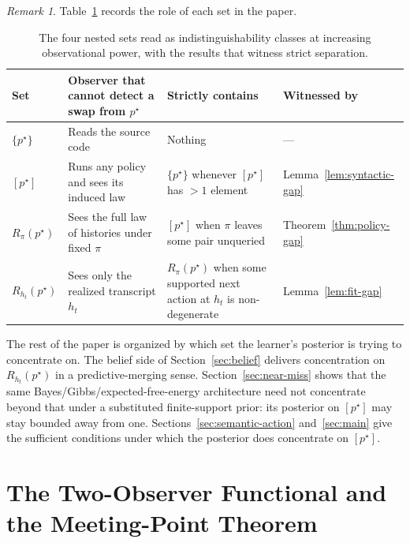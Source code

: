 \documentclass[11pt]{article}
\theoremstyle{definition}
\theoremstyle{remark}
\newtheorem{remark}[theorem]{Remark}
\begin{document}
\begin{remark}
Table~\ref{tab:hierarchy} records the role of each set in the paper.
\end{remark}

\begin{table}[ht]
\centering
\small
\caption{The four nested sets read as indistinguishability classes at increasing observational power, with the results that witness strict separation.}
\label{tab:hierarchy}
\begin{tabularx}{\textwidth}{@{}>{\raggedright\arraybackslash}p{}>{\raggedright\arraybackslash}p{}>{\raggedright\arraybackslash}X>{\raggedright\arraybackslash}p{}@{}}
\toprule
\textbf{Set} & \textbf{Observer that cannot detect a swap from $p^\star$} & \textbf{Strictly contains} & \textbf{Witnessed by} \\
\midrule
$\{p^\star\}$ & Reads the source code & Nothing & --- \\
$[p^\star]$ & Runs any policy and sees its induced law & $\{p^\star\}$ whenever $[p^\star]$ has $>1$ element & Lemma~\ref{lem:syntactic-gap} \\
$R_\pi(p^\star)$ & Sees the full law of histories under fixed $\pi$ & $[p^\star]$ when $\pi$ leaves some pair unqueried & Theorem~\ref{thm:policy-gap} \\
$R_{h_t}(p^\star)$ & Sees only the realized transcript $h_t$ & $R_\pi(p^\star)$ when some supported next action at $h_t$ is non-degenerate & Lemma~\ref{lem:fit-gap} \\
\bottomrule
\end{tabularx}
\end{table}

The rest of the paper is organized by which set the learner's posterior is trying to concentrate on. The belief side of Section~\ref{sec:belief} delivers concentration on $R_{h_t}(p^\star)$ in a predictive-merging sense. Section~\ref{sec:near-miss} shows that the same Bayes/Gibbs/expected-free-energy architecture need not concentrate beyond that under a substituted finite-support prior: its posterior on $[p^\star]$ may stay bounded away from one. Sections~\ref{sec:semantic-action} and~\ref{sec:main} give the sufficient conditions under which the posterior does concentrate on $[p^\star]$.

\section{The Two-Observer Functional and the Meeting-Point Theorem}
\label{sec:functional}
\end{document}
